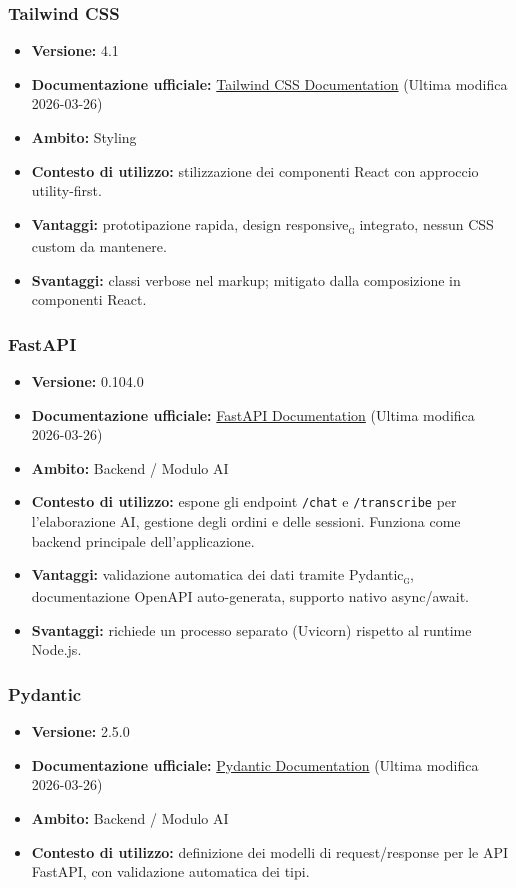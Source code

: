 \documentclass[a4paper, 11pt, oneside]{scrartcl}
\begin{document}
\subsubsection{Tailwind CSS}
\begin{itemize}[noitemsep]
\item \textbf{Versione:} 4.1
\item \textbf{Documentazione ufficiale:} \href{https://tailwindcss.com/docs}{Tailwind CSS Documentation} (Ultima modifica 2026-03-26)
\item \textbf{Ambito:} Styling
\item \textbf{Contesto di utilizzo:} stilizzazione dei componenti React con approccio utility-first.
\item \textbf{Vantaggi:} prototipazione rapida, design responsive\textsubscript{\textsc{g}} integrato, nessun CSS custom da mantenere.
\item \textbf{Svantaggi:} classi verbose nel markup; mitigato dalla composizione in componenti React.
\end{itemize}

\subsubsection{FastAPI}
\begin{itemize}[noitemsep]
\item \textbf{Versione:} 0.104.0
\item \textbf{Documentazione ufficiale:} \href{https://fastapi.tiangolo.com/}{FastAPI Documentation} (Ultima modifica 2026-03-26)
\item \textbf{Ambito:} Backend / Modulo AI
\item \textbf{Contesto di utilizzo:} espone gli endpoint \texttt{/chat} e \texttt{/transcribe} per l'elaborazione AI, gestione degli ordini e delle sessioni. Funziona come backend principale dell’applicazione.
\item \textbf{Vantaggi:} validazione automatica dei dati tramite Pydantic\textsubscript{\textsc{g}}, documentazione OpenAPI auto-generata, supporto nativo async/await.
\item \textbf{Svantaggi:} richiede un processo separato (Uvicorn) rispetto al runtime Node.js.
\end{itemize}

\subsubsection{Pydantic}
\begin{itemize}[noitemsep]
\item \textbf{Versione:} 2.5.0
\item \textbf{Documentazione ufficiale:} \href{https://docs.pydantic.dev/latest/}{Pydantic Documentation} (Ultima modifica 2026-03-26)
\item \textbf{Ambito:} Backend / Modulo AI
\item \textbf{Contesto di utilizzo:} definizione dei modelli di request/response per le API FastAPI, con validazione automatica dei tipi.
\end{itemize}
\end{document}
